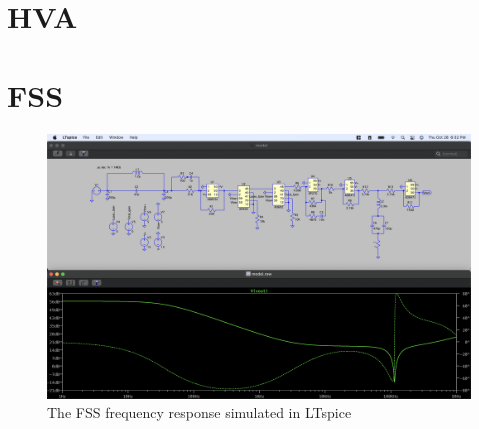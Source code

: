 \section{HVA}






\section{FSS}



\begin{figure}[H]
\includegraphics[width=\textwidth]{figs/ALGAAS/tfs/spice_FSS_tf.png}
\caption{The FSS frequency response simulated in LTspice}
\label{fig:spiceFSS}
\end{figure}
